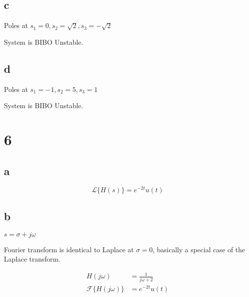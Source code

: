 \documentclass{article}
\begin{document}
\begin{multicols}{2}
\subsection*{c}
Poles at $s_1 = 0, s_2 = \sqrt{2}, s_3 = -\sqrt{2}$

System is BIBO Unstable.
\subsection*{d}
Poles at $s_1 = -1, s_2 = 5, s_3 = 1$

System is BIBO Unstable.
\section*{6}
\subsection*{a}
$$\mathcal{L}\{H(s)\} = e^{-2t}u(t)$$
\subsection*{b}
$s = \sigma + j\omega$

Fourier transform is identical to Laplace at $\sigma = 0$, basically a special case of the Laplace transform.

\begin{align*}
    H(j\omega) &= \frac{1}{j\omega + 2}\\
    \mathcal{F}\{H(j\omega)\} &= e^{-2t} u(t)\\
\end{align*}
\end{multicols}
\end{document}
